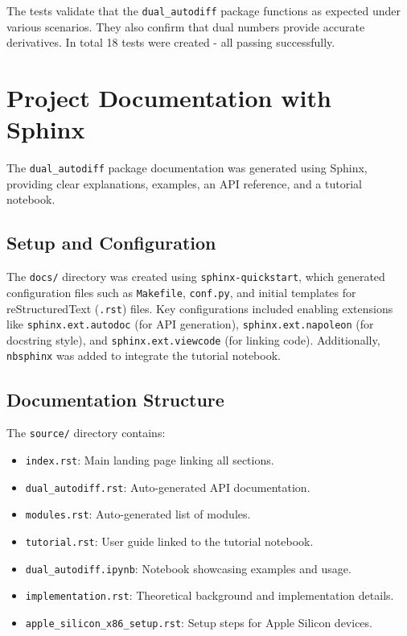 \documentclass[a4paper,12pt]{article}
\begin{document}
The tests validate that the \texttt{dual\_autodiff} package functions as expected under various scenarios. They also confirm that dual numbers provide accurate derivatives.
In total 18 tests were created - all passing successfully.


\section{Project Documentation with Sphinx}

The \texttt{dual\_autodiff} package documentation was generated using Sphinx, providing clear explanations, examples, an API reference, and a tutorial notebook.

\subsection{Setup and Configuration}
The \texttt{docs/} directory was created using \texttt{sphinx-quickstart}, which generated configuration files such as \texttt{Makefile}, \texttt{conf.py}, and initial templates for reStructuredText (\texttt{.rst}) files. Key configurations included enabling extensions like \texttt{sphinx.ext.autodoc} (for API generation), \texttt{sphinx.ext.napoleon} (for docstring style), and \texttt{sphinx.ext.viewcode} (for linking code). Additionally, \texttt{nbsphinx} was added to integrate the tutorial notebook.

\subsection{Documentation Structure}
The \texttt{source/} directory contains:
\begin{itemize}
    \item \texttt{index.rst}: Main landing page linking all sections.
    \item \texttt{dual\_autodiff.rst}: Auto-generated API documentation.
    \item \texttt{modules.rst}: Auto-generated list of modules.
    \item \texttt{tutorial.rst}: User guide linked to the tutorial notebook.
    \item \texttt{dual\_autodiff.ipynb}: Notebook showcasing examples and usage.
    \item \texttt{implementation.rst}: Theoretical background and implementation details.
    \item \texttt{apple\_silicon\_x86\_setup.rst}: Setup steps for Apple Silicon devices.
\end{itemize}
\end{document}
